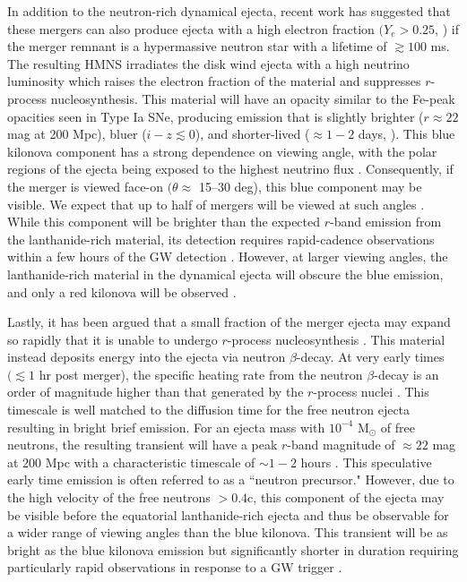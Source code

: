 In addition to the neutron-rich dynamical ejecta, recent work has suggested that these mergers can also produce ejecta with a high electron fraction $(Y_e > 0.25$,  \citealt{Wanajo+14,Goriely+15}) if the merger remnant is a hypermassive neutron star \citep[HMNS; see e.g.,][]{Sekiguchi+11} with a lifetime of $\gtrsim 100$ ms. The resulting HMNS irradiates the disk wind ejecta with a high neutrino luminosity which raises the electron fraction of the material and suppresses $r$-process nucleosynthesis. This material will have an opacity similar to the Fe-peak opacities seen in Type Ia SNe, producing emission that is slightly brighter ($r \approx 22$ mag at 200 Mpc), bluer ($i-z \lesssim 0$), and shorter-lived ($\approx 1-2$ days, \citealt{MetzgerFernandez14,Kasen+15}). This blue kilonova component has a strong dependence on viewing angle, with the polar regions of the ejecta being exposed to the highest neutrino flux \citep{MetzgerFernandez14,Kasen+15}. Consequently, if the merger is viewed face-on $(\theta \approx$ 15--30 deg), this blue component may be visible. We expect that up to half of mergers will be viewed at such angles \citep[see e.g.,][]{MetzgerBerger12}. While this component will be brighter than the expected $r$-band emission from the lanthanide-rich material, its detection requires rapid-cadence observations within a few hours of the GW detection \citep{CowpBerger15}. However, at larger viewing angles, the lanthanide-rich material in the dynamical ejecta will obscure the blue emission, and only a red kilonova will be observed \citep{Kasen+15,Metzger2017}.

Lastly, it has been argued that a small fraction of the merger ejecta may expand so rapidly that it is unable to undergo $r$-process nucleosynthesis \citep{Bauswein+13a}. This material instead deposits energy into the ejecta via neutron $\beta$-decay. At very early times $(\lesssim 1$ hr post merger), the specific heating rate from the neutron $\beta$-decay is an order of magnitude higher than that generated by the $r$-process nuclei \citep{Metzger2017}. This timescale is well matched to the diffusion time for the free neutron ejecta resulting in bright brief emission. For an ejecta mass with $10^{-4}$ M$_{\odot}$ of free neutrons, the resulting transient will have a peak $r$-band magnitude of $\approx 22$ mag at 200 Mpc with a characteristic timescale of $\sim 1-2$ hours \citep{Metzger+15}. This speculative early time emission is often referred to as a ``neutron precursor." However, due to the high velocity of the free neutrons $>0.4$c, this component of the ejecta may be visible before the equatorial lanthanide-rich ejecta and thus be observable for a wider range of viewing angles than the blue kilonova. This transient will be as bright as the blue kilonova emission but significantly shorter in duration requiring particularly rapid observations in response to a GW trigger \citep{CowpBerger15}.

